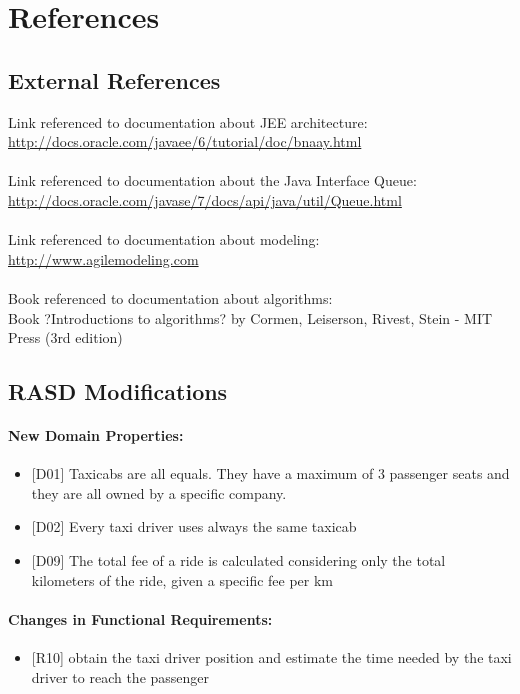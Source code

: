 \chapter{References} \label{chap6}
\section{External References}
Link referenced to documentation about JEE architecture:\\
\href{http://docs.oracle.com/javaee/6/tutorial/doc/bnaay.html} {http://docs.oracle.com/javaee/6/tutorial/doc/bnaay.html} \\ \\
Link referenced to documentation about the Java Interface Queue:\\
\href{http://docs.oracle.com/javase/7/docs/api/java/util/Queue.html} {http://docs.oracle.com/javase/7/docs/api/java/util/Queue.html} \\ \\
Link referenced to documentation about modeling:\\
\href{http://www.agilemodeling.com} {http://www.agilemodeling.com} \\ \\
Book referenced to documentation about algorithms:\\
Book ?Introductions to algorithms? by Cormen, Leiserson, Rivest, Stein - MIT Press (3rd edition)

\section{RASD Modifications}
\subsubsection{New Domain Properties:}
\begin{itemize}
	\item {[D01]} Taxicabs are all equals. They have a maximum of 3 passenger seats and they are all owned by a specific company.
	\item {[D02]} Every taxi driver uses always the same taxicab
	\item {[D09]} The total fee of a ride is calculated considering only the total kilometers of the ride, given a specific fee per km
\end{itemize}

\subsubsection{Changes in Functional Requirements:}
\begin{itemize}
	\item {[R10]} obtain the taxi driver position and estimate the time needed by the taxi driver to reach the passenger
\end{itemize}

